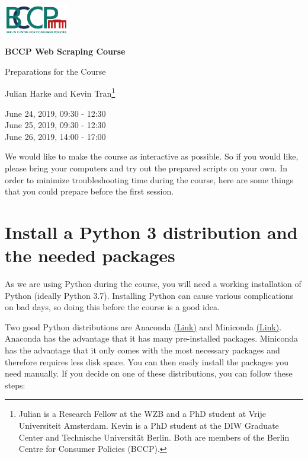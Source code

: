 \documentclass[a4paper]{article}
\begin{document}
\includegraphics[width=80pt]{../misc/bccp_logo_transparent.png}
\vspace{1cm}

\begin{center}
\textbf{\Large BCCP Web Scraping Course}

{\large Preparations for the Course}
\vspace{0.3cm}

Julian Harke and Kevin Tran\footnote{Julian is a Research Fellow at the WZB and a PhD student at Vrije Universiteit Amsterdam. Kevin is a PhD student at the DIW Graduate Center and Technische Universit\"at Berlin. Both are members of the Berlin Centre for Consumer Policies (BCCP).} \vspace{0.3cm}

June 24, 2019, 09:30 - 12:30 \\
June 25, 2019, 09:30 - 12:30 \\
June 26, 2019, 14:00 - 17:00
\end{center}

We would like to make the course as interactive as possible. So if you would like, please bring your computers and try out the prepared scripts on your own. In order to minimize troubleshooting time during the course, here are some things that you could prepare before the first session.

\section{Install a Python 3 distribution and the needed packages}

As we are using Python during the course, you will need a working installation of Python (ideally Python 3.7). Installing Python can cause various complications on bad days, so doing this before the course is a good idea.

Two good Python distributions are Anaconda \href{https://www.anaconda.com/distribution/}{(Link)} and Miniconda \href{https://docs.conda.io/en/latest/miniconda.html}{(Link)}. Anaconda has the advantage that it has many pre-installed packages. Miniconda has the advantage that it only comes with the most necessary packages and therefore requires less disk space. You can then easily install the packages you need manually. If you decide on one of these distributions, you can follow these steps:
\end{document}
